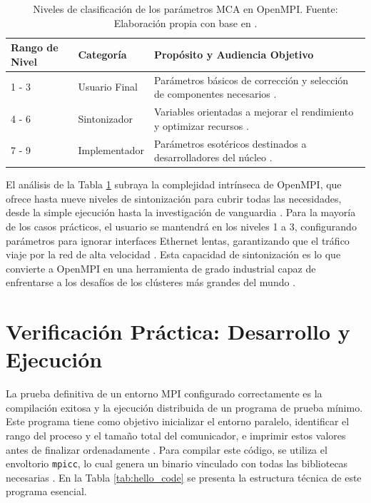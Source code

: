 \begin{table}[H]
    \centering
    \caption{Niveles de clasificación de los parámetros MCA en OpenMPI. Fuente: Elaboración propia con base en \cite{ref7_cristian_Squyres2004, ref11_cristian_OpenMPI_FAQ}.}
    \label{tab:mca_levels}
    \begin{tabular}{|l|l|p{7cm}|}
    \hline
    \textbf{Rango de Nivel} & \textbf{Categoría} & \textbf{Propósito y Audiencia Objetivo} \\ \hline
    1 - 3 & Usuario Final & Parámetros básicos de corrección y selección de componentes necesarios \cite{ref11_cristian_OpenMPI_FAQ}. \\ \hline
    4 - 6 & Sintonizador & Variables orientadas a mejorar el rendimiento y optimizar recursos \cite{ref7_cristian_Squyres2004}. \\ \hline
    7 - 9 & Implementador & Parámetros esotéricos destinados a desarrolladores del núcleo \cite{ref7_cristian_Squyres2004}. \\ \hline
    \end{tabular}
\end{table}

El análisis de la Tabla \ref{tab:mca_levels} subraya la complejidad intrínseca de OpenMPI, que ofrece hasta nueve niveles de sintonización para cubrir todas las necesidades, desde la simple ejecución hasta la investigación de vanguardia \cite{ref7_cristian_Squyres2004, ref11_cristian_OpenMPI_FAQ}. Para la mayoría de los casos prácticos, el usuario se mantendrá en los niveles 1 a 3, configurando parámetros para ignorar interfaces Ethernet lentas, garantizando que el tráfico viaje por la red de alta velocidad \cite{ref5_cristian_Graham2006, ref11_cristian_OpenMPI_FAQ}. Esta capacidad de sintonización es lo que convierte a OpenMPI en una herramienta de grado industrial capaz de enfrentarse a los desafíos de los clústeres más grandes del mundo \cite{ref4_cristian_Graham2005, ref5_cristian_Graham2006}.

\section{Verificación Práctica: Desarrollo y Ejecución}


La prueba definitiva de un entorno MPI configurado correctamente es la compilación exitosa y la ejecución distribuida de un programa de prueba mínimo. Este programa tiene como objetivo inicializar el entorno paralelo, identificar el rango del proceso y el tamaño total del comunicador, e imprimir estos valores antes de finalizar ordenadamente \cite{ref9_cristian_Gropp1996, ref8_cristian_Nielsen2016, ref11_cristian_OpenMPI_FAQ}. Para compilar este código, se utiliza el envoltorio \texttt{mpicc}, lo cual genera un binario vinculado con todas las bibliotecas necesarias \cite{ref11_cristian_OpenMPI_FAQ, ref12_cristian_Ubuntu_Packages}. En la Tabla \ref{tab:hello_code} se presenta la estructura técnica de este programa esencial.

